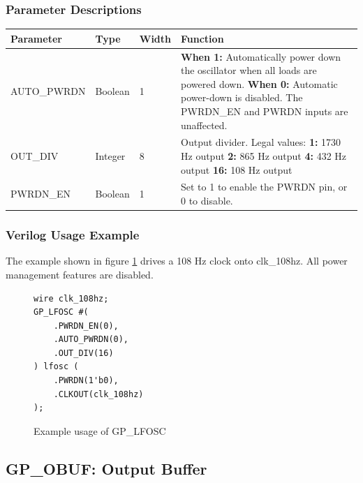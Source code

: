 \documentclass{article}
\begin{document}
\subsubsection{Parameter Descriptions}

\begin{tabularx}{5in}{|l|l|l|X|}
\hline
{\bfseries Parameter} & {\bfseries Type} & {\bfseries Width} & {\bfseries Function} \\
\hline
AUTO\_PWRDN & Boolean & 1 & 
	{\bfseries When 1: } \newline Automatically power down the oscillator when all loads are powered down. \newline
	{\bfseries When 0: } \newline Automatic power-down is disabled. The PWRDN\_EN and PWRDN inputs are unaffected.\\
\hline
OUT\_DIV & Integer & 8 &
	Output divider. Legal values: \newline
	{\bfseries 1:} 1730 Hz output \newline
	{\bfseries 2:} 865 Hz output \newline
	{\bfseries 4:} 432 Hz output \newline
	{\bfseries 16:} 108 Hz output
\\
\hline
PWRDN\_EN & Boolean & 1 & Set to 1 to enable the PWRDN pin, or 0 to disable. \\
\hline
\end{tabularx}

\pagebreak
\subsubsection{Verilog Usage Example}

The example shown in figure \ref{gp-lfosc-example} drives a 108 Hz clock onto clk\_108hz. All power management features 
are disabled.

\begin{figure}[h]
\begin{lstlisting}
wire clk_108hz;
GP_LFOSC #(
	.PWRDN_EN(0),
	.AUTO_PWRDN(0),
	.OUT_DIV(16)
) lfosc (
	.PWRDN(1'b0),
	.CLKOUT(clk_108hz)
);
\end{lstlisting}
\caption{Example usage of GP\_LFOSC}
\label{gp-lfosc-example}
\end{figure}


\pagebreak
\subsection{GP\_OBUF: Output Buffer}
\end{document}
